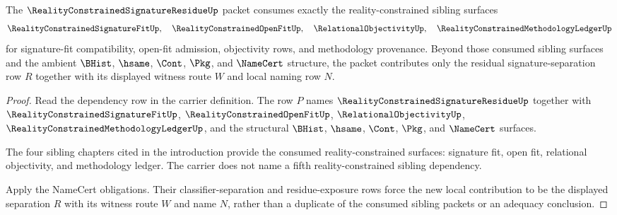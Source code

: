 \begin{theorem}
\label{thm:reality-constrained-signature-residue-dependency-handoff}
The $\RealityConstrainedSignatureResidueUp$ packet consumes exactly the reality-constrained sibling surfaces
$$
\RealityConstrainedSignatureFitUp,\quad
\RealityConstrainedOpenFitUp,\quad
\RelationalObjectivityUp,\quad
\RealityConstrainedMethodologyLedgerUp
$$
for signature-fit compatibility, open-fit admission, objectivity rows, and methodology provenance. Beyond those consumed sibling surfaces and the ambient $\BHist$, $\hsame$, $\Cont$, $\Pkg$, and $\NameCert$ structure, the packet contributes only the residual signature-separation row $R$ together with its displayed witness route $W$ and local naming row $N$.
\end{theorem}
\begin{proof}
Read the dependency row in the carrier definition. The row $P$ names $\RealityConstrainedSignatureResidueUp$ together with $\RealityConstrainedSignatureFitUp$, $\RealityConstrainedOpenFitUp$, $\RelationalObjectivityUp$, $\RealityConstrainedMethodologyLedgerUp$, and the structural $\BHist$, $\hsame$, $\Cont$, $\Pkg$, and $\NameCert$ surfaces.

The four sibling chapters cited in the introduction provide the consumed reality-constrained surfaces: signature fit, open fit, relational objectivity, and methodology ledger. The carrier does not name a fifth reality-constrained sibling dependency.

Apply the NameCert obligations. Their classifier-separation and residue-exposure rows force the new local contribution to be the displayed separation $R$ with its witness route $W$ and name $N$, rather than a duplicate of the consumed sibling packets or an adequacy conclusion.
\end{proof}

